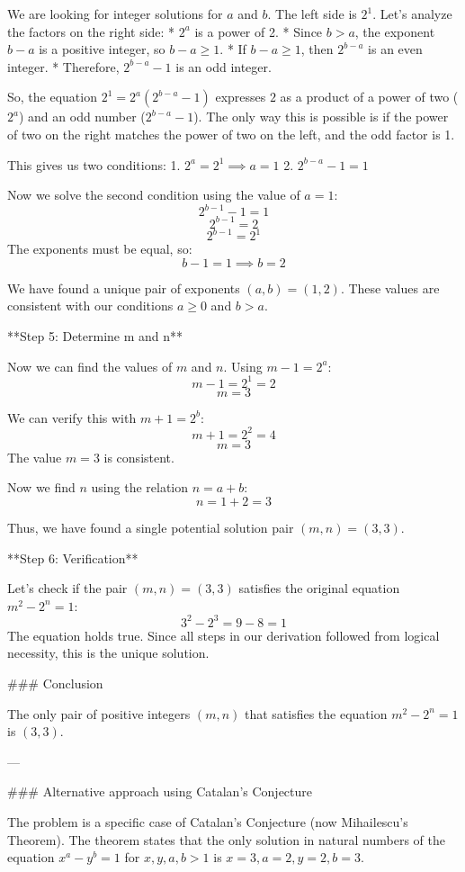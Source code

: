 We are looking for integer solutions for $a$ and $b$. The left side is $2^1$. Let's analyze the factors on the right side:
*   $2^a$ is a power of 2.
*   Since $b>a$, the exponent $b-a$ is a positive integer, so $b-a \ge 1$.
    *   If $b-a \ge 1$, then $2^{b-a}$ is an even integer.
    *   Therefore, $2^{b-a} - 1$ is an odd integer.

So, the equation $2^1 = 2^a(2^{b-a} - 1)$ expresses $2$ as a product of a power of two ($2^a$) and an odd number ($2^{b-a} - 1$). The only way this is possible is if the power of two on the right matches the power of two on the left, and the odd factor is 1.

This gives us two conditions:
1. $2^a = 2^1 \implies a=1$
2. $2^{b-a} - 1 = 1$

Now we solve the second condition using the value of $a=1$:
$$2^{b-1} - 1 = 1$$
$$2^{b-1} = 2$$
$$2^{b-1} = 2^1$$
The exponents must be equal, so:
$$b-1 = 1 \implies b=2$$

We have found a unique pair of exponents $(a,b) = (1,2)$. These values are consistent with our conditions $a \ge 0$ and $b > a$.

**Step 5: Determine m and n**

Now we can find the values of $m$ and $n$.
Using $m-1 = 2^a$:
$$m-1 = 2^1 = 2$$
$$m = 3$$

We can verify this with $m+1 = 2^b$:
$$m+1 = 2^2 = 4$$
$$m = 3$$
The value $m=3$ is consistent.

Now we find $n$ using the relation $n=a+b$:
$$n = 1+2 = 3$$

Thus, we have found a single potential solution pair $(m, n) = (3, 3)$.

**Step 6: Verification**

Let's check if the pair $(m,n)=(3,3)$ satisfies the original equation $m^2 - 2^n = 1$:
$$3^2 - 2^3 = 9 - 8 = 1$$
The equation holds true. Since all steps in our derivation followed from logical necessity, this is the unique solution.

### Conclusion

The only pair of positive integers $(m, n)$ that satisfies the equation $m^2 - 2^n = 1$ is $(3, 3)$.

---

### Alternative approach using Catalan's Conjecture

The problem is a specific case of Catalan's Conjecture (now Mihailescu's Theorem). The theorem states that the only solution in natural numbers of the equation $x^a - y^b = 1$ for $x, y, a, b > 1$ is $x=3, a=2, y=2, b=3$.

